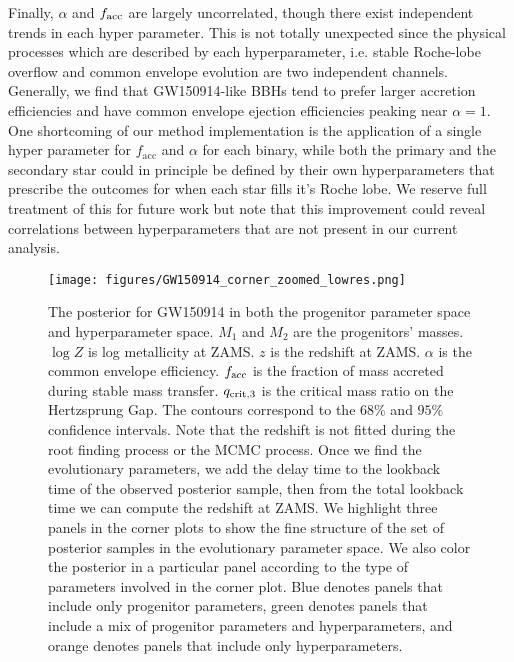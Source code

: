 \documentclass[linenumbers,twocolumn]{aastex631}
\begin{document}
Finally, $\alpha$ and $f_{\rm acc}$ are largely uncorrelated,
though there exist independent trends in each hyper parameter. This is not
totally unexpected since the physical processes which are described by each
hyperparameter, i.e. stable Roche-lobe overflow and common envelope evolution
are two independent channels. Generally, we find that GW150914-like BBHs tend to
prefer larger accretion efficiencies and have common envelope ejection
efficiencies peaking near $\alpha=1$. One shortcoming of our method
implementation is the application of a single hyper parameter for
$f_{\mathrm{acc}}$ and $\alpha$ for each binary, while both the primary and the
secondary star could in principle be defined by their own hyperparameters that
prescribe the outcomes for when each star fills it's Roche lobe. We reserve full
treatment of this for future work but note that this improvement could reveal
correlations between hyperparameters that are not present in our current
analysis.


\begin{figure*}[h]
    \texttt{[image: figures/GW150914\_corner\_zoomed\_lowres.png]}
    \caption{The posterior for GW150914 in both the progenitor parameter space
    and hyperparameter space. $M_1$ and $M_2$ are the progenitors' masses.
    $\log{Z}$ is log metallicity at ZAMS. $z$ is the redshift at ZAMS. $\alpha$
    is the common envelope efficiency. $f_{\rm acc}$ is the fraction of mass
    accreted during stable mass transfer. $q_{\rm crit, 3}$ is the critical mass
    ratio on the Hertzsprung Gap. The contours correspond to the $68\%$ and
    $95\%$ confidence intervals. Note that the redshift is not fitted during the
    root finding process or the MCMC process. Once we find the evolutionary
    parameters, we add the delay time to the lookback time of the observed
    posterior sample, then from the total lookback time we can compute the
    redshift at ZAMS. We highlight three panels in the corner plots to show the
    fine structure of the set of posterior samples in the evolutionary parameter
    space. We also color the posterior in a particular panel according to the
    type of parameters involved in the corner plot. Blue denotes panels that
    include only progenitor parameters, green denotes panels that include a mix
    of progenitor parameters and hyperparameters, and orange denotes panels that
    include only hyperparameters. }
    \label{fig:GW150914_posterior}
\end{figure*}
\end{document}
